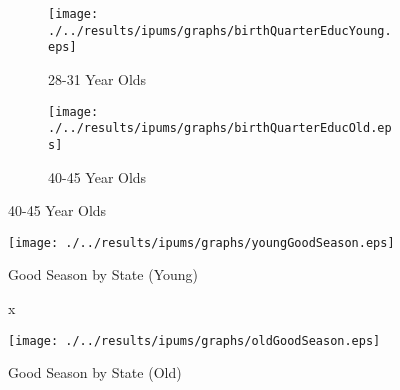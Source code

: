 \begin{figure}[htpb!]
\begin{center}
\caption{Education and Birth Quarter}
\label{bqFig:concepEducIPUMS}
 \begin{subfigure}{.5\textwidth}
   \centering
   \texttt{[image: ./../results/ipums/graphs/birthQuarterEducYoung.eps]}
   \caption{28-31 Year Olds}
   \label{fig:educYoungIPUMS}
 \end{subfigure}%
 \begin{subfigure}{.5\textwidth}
   \centering
   \texttt{[image: ./../results/ipums/graphs/birthQuarterEducOld.eps]}
   \caption{40-45 Year Olds}
   \label{fig:educOldIPUMS}
 \end{subfigure}
 \end{center}
\end{figure}

 
 \begin{figure}[htpb!]
 \begin{center}
   \centering
   \caption{Good Season by State (Young)}
   \texttt{[image: ./../results/ipums/graphs/youngGoodSeason.eps]}
   \label{fig:mapYoungIPUMS}
 \end{center}
 \end{figure}
 
 \begin{figure}[htpb!]
 \begin{center}x
   \centering
   \caption{Good Season by State (Old)}
   \texttt{[image: ./../results/ipums/graphs/oldGoodSeason.eps]}
   \label{fig:mapOldIPUMS}
 \end{center}
 \end{figure}
 
